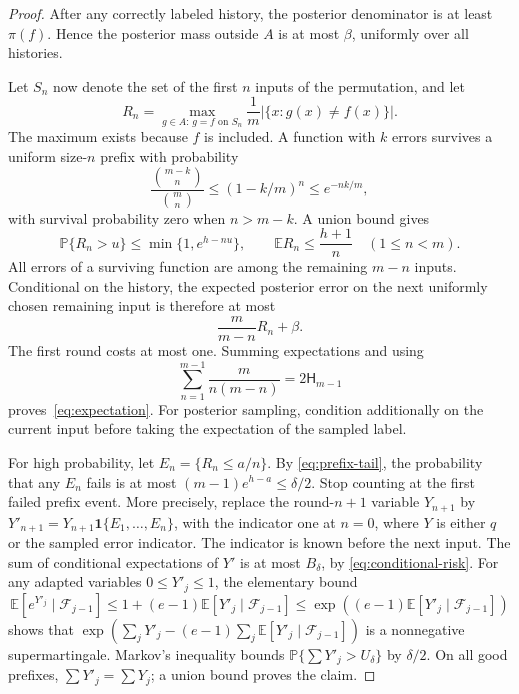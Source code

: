 \documentclass[11pt]{article}
\theoremstyle{remark}\newtheorem{remark}[theorem]{Remark}
\newcommand{\E}{\mathbb E}\newcommand{\Pp}{\mathbb P}
\newcommand{\HH}{\mathsf H}
\begin{document}
\begin{proof}
After any correctly labeled history, the posterior denominator is at least
$\pi(f)$. Hence the posterior mass outside $A$ is at most $\beta$,
uniformly over all histories.

Let $S_n$ now denote the set of the first $n$ inputs of the permutation,
and let
\[
 R_n=\max_{g\in A:\,g=f\text{ on }S_n}
       \frac1m|\{x:g(x)\ne f(x)\}|.
\]
The maximum exists because $f$ is included. A function with $k$ errors
survives a uniform size-$n$ prefix with probability
\[
 \frac{\binom{m-k}{n}}{\binom mn}
 \le(1-k/m)^n\le e^{-nk/m},
\]
with survival probability zero when $n>m-k$. A union bound gives
\begin{equation}\label{eq:prefix-tail}
 \Pp\{R_n>u\}\le\min\{1,e^{h-nu}\},\qquad
 \E R_n\le\frac{h+1}{n}\quad(1\le n<m).
\end{equation}
All errors of a surviving function are among the remaining $m-n$ inputs.
Conditional on the history, the expected posterior error on the next
uniformly chosen remaining input is therefore at most
\begin{equation}\label{eq:conditional-risk}
 \frac m{m-n}R_n+\beta.
\end{equation}
The first round costs at most one. Summing expectations and using
\[
 \sum_{n=1}^{m-1}\frac{m}{n(m-n)}=2\HH_{m-1}
\]
proves~\eqref{eq:expectation}. For posterior sampling, condition additionally
on the current input before taking the expectation of the sampled label.

For high probability, let $E_n=\{R_n\le a/n\}$. By
\eqref{eq:prefix-tail}, the probability that any $E_n$ fails is at most
$(m-1)e^{h-a}\le\delta/2$. Stop counting at the first failed prefix
event. More precisely, replace the round-$n+1$ variable $Y_{n+1}$ by
$Y'_{n+1}=Y_{n+1}\mathbf1\{E_1,\ldots,E_n\}$, with the indicator one
at $n=0$, where $Y$ is either $q$ or the sampled error indicator.
The indicator is known before the next input. The sum of conditional
expectations of $Y'$ is at most $B_\delta$, by
\eqref{eq:conditional-risk}. For any adapted variables $0\le Y'_j\le1$,
the elementary bound
\[
 \E[e^{Y'_j}\mid\mathcal F_{j-1}]
 \le1+(e-1)\E[Y'_j\mid\mathcal F_{j-1}]
 \le\exp((e-1)\E[Y'_j\mid\mathcal F_{j-1}])
\]
shows that
$\exp(\sum_jY'_j-(e-1)\sum_j\E[Y'_j\mid\mathcal F_{j-1}])$
is a nonnegative supermartingale. Markov's inequality bounds
$\Pp\{\sum Y'_j>U_\delta\}$ by $\delta/2$. On all good prefixes,
$\sum Y'_j=\sum Y_j$; a union bound proves the claim.
\end{proof}
\end{document}
